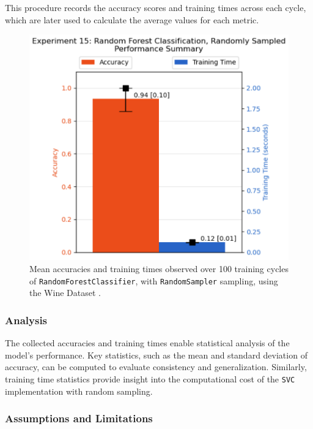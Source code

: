 \documentclass{article}
\theoremstyle{plain}
\theoremstyle{definition}
\theoremstyle{remark}
\begin{document}
This procedure records the accuracy scores and training times across each cycle, which are later used to calculate the average values for each metric.

\begin{figure}[ht]
	\vskip 0.2in
	\begin{center}
		\centerline{\includegraphics[width=\columnwidth]{experiment_15}}
		\caption{Mean accuracies and training times observed over 100 training cycles of \texttt{RandomForestClassifier}, with \texttt{RandomSampler} sampling, using the Wine Dataset \cite{wine}.}
		\label{experiment_15}
	\end{center}
	\vskip -0.2in
\end{figure}

\subsubsection{Analysis}

The collected accuracies and training times enable statistical analysis of the model's performance. Key statistics, such as the mean and standard deviation of accuracy, can be computed to evaluate consistency and generalization. Similarly, training time statistics provide insight into the computational cost of the \texttt{SVC} implementation with random sampling.

\subsubsection{Assumptions and Limitations}
\end{document}
